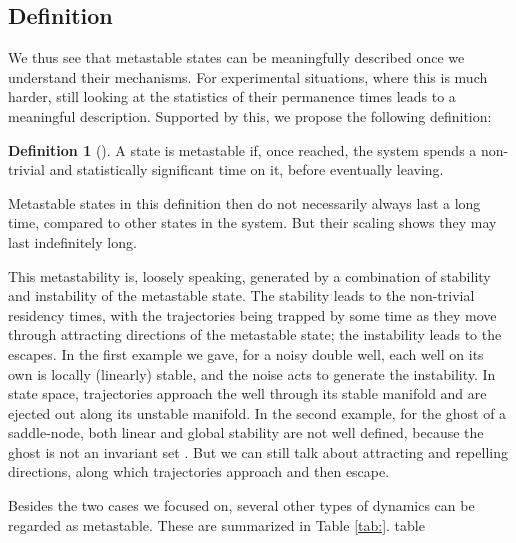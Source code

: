\documentclass[preprint,superscriptaddress,showpacs,amsmath,amssymb,aps,pre,floatfix]{revtex4-1}
\theoremstyle{definition}
\newtheorem{definition}{Definition}[section]
\begin{document}
\subsection{Definition}
We thus see that metastable states can be meaningfully described once we understand their mechanisms. For experimental situations, where this is much harder, still looking at the statistics of their permanence times leads to a meaningful description. Supported by this, we propose the following definition:
%
\begin{definition}[]
A state is metastable if, once reached, the system spends a non-trivial and statistically significant time on it, before eventually leaving.
\end{definition}

Metastable states in this definition then do not necessarily always last a long time, compared to other states in the system. But their scaling shows they may last indefinitely long. 

This metastability is, loosely speaking, generated by a combination of stability and instability of the metastable state. The stability leads to the non-trivial residency times, with the trajectories being trapped by some time as they move through attracting directions of the metastable state; the instability leads to the escapes. In the first example we gave, for a noisy double well, each well on its own is locally (linearly) stable, and the noise acts to generate the instability. In state space, trajectories approach the well through its stable manifold and are ejected out along its unstable manifold. In the second example, for the ghost of a saddle-node, both linear and global stability are not well defined, because the ghost is not an invariant set \cite{}. But we can still talk about attracting and repelling directions, along which trajectories approach and then escape. 

Besides the two cases we focused on, several other types of dynamics can be regarded as metastable. These are summarized in Table \ref{tab:}.
table 
\end{document}
